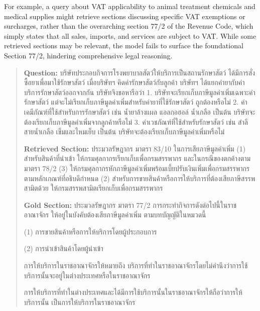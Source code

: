 For example, a query about VAT applicability to animal treatment chemicals and medical supplies might retrieve sections discussing specific VAT exemptions or surcharges, rather than the overarching section 77/2 of the Revenue Code, which simply states that all sales, imports, and services are subject to VAT. While some retrieved sections may be relevant, the model fails to surface the foundational Section 77/2, hindering comprehensive legal reasoning.



    \begin{quote}
        \begin{thai}
        \textbf{Question: } บริษัทประกอบกิจการโรงพยาบาลสัตว์ให้บริการเป็นสถานรักษาสัตว์ ได้มีการสั่งซื้อยาเพื่อมาใช้รักษาสัตว์ เมื่อบริษัทฯ คิดค่ารักษาสัตว์กับลูกค้า บริษัทฯ ได้แยกค่ายากับค่าบริการรักษาสัตว์ออกจากกัน บริษัทจึงขอหารือว่า
    1. บริษัทจะเรียกเก็บภาษีมูลค่าเพิ่มเฉพาะค่ารักษาสัตว์ แต่จะไม่เรียกเก็บภาษีมูลค่าเพิ่มสำหรับค่ายาที่ใช้รักษาสัตว์ ถูกต้องหรือไม่
    2. ค่าเคมีภัณฑ์ที่ใช้สำหรับการรักษาสัตว์ เช่น น้ำยาล้างแผล แอลกอฮอล์ น้ำเกลือ เป็นต้น บริษัทจะต้องเรียกเก็บภาษีมูลค่าเพิ่มจากลูกค้าหรือไม่
    3. ค่าเวชภัณฑ์ที่ใช้สำหรับรักษาสัตว์ เช่น สำลี สายน้ำเกลือ เข็มและไหมเย็บ เป็นต้น บริษัทจะต้องเรียกเก็บภาษีมูลค่าเพิ่มหรือไม่       

        \textbf{Retrieved Section: } ประมวลรัษฎากร มาตรา 83/10 ในการเสียภาษีมูลค่าเพิ่ม
(1) สำหรับสินค้าที่นำเข้า ให้กรมศุลกากรเรียกเก็บเพื่อกรมสรรพากร และในกรณีของตกค้างตามมาตรา 78/2 (3) ให้กรมศุลกากรหักภาษีมูลค่าเพิ่มพร้อมเบี้ยปรับเงินเพิ่มเพื่อกรมสรรพากรตามหลักเกณฑ์ที่อธิบดีกำหนด
(2) สำหรับการขายสินค้าหรือการให้บริการที่ต้องเสียภาษีสรรพสามิตด้วย ให้กรมสรรพสามิตเรียกเก็บเพื่อกรมสรรพากร

        \textbf{Gold Section: } ประมวลรัษฎากร มาตรา 77/2 การกระทำกิจการดังต่อไปนี้ในราชอาณาจักร ให้อยู่ในบังคับต้องเสียภาษีมูลค่าเพิ่ม ตามบทบัญญัติในหมวดนี้

(1) การขายสินค้าหรือการให้บริการโดยผู้ประกอบการ

(2) การนำเข้าสินค้าโดยผู้นำเข้า

การให้บริการในราชอาณาจักรให้หมายถึง บริการที่ทำในราชอาณาจักรโดยไม่คำนึงว่าการใช้บริการนั้นจะอยู่ในต่างประเทศหรือในราชอาณาจักร

การให้บริการที่ทำในต่างประเทศและได้มีการใช้บริการนั้นในราชอาณาจักรให้ถือว่าการให้บริการนั้น เป็นการให้บริการในราชอาณาจักร
        \end{thai}
    \end{quote}



